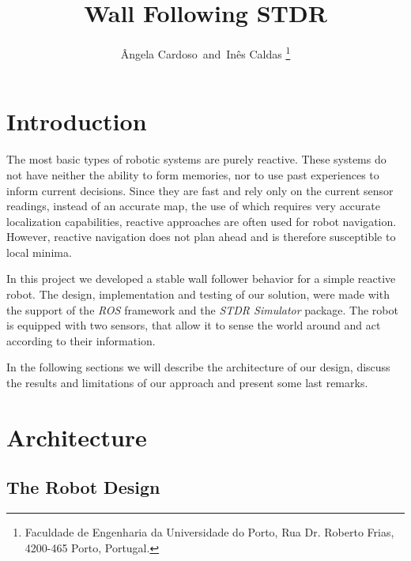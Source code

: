 \documentclass[10pt,journal,compsoc]{IEEEtran}
\begin{document}
\title{Wall Following STDR}
\author{\^{A}ngela Cardoso~and~In\^{e}s Caldas%
\thanks{Faculdade de Engenharia da Universidade do Porto, Rua Dr. Roberto Frias, 4200-465 Porto, Portugal.}}



\maketitle


\section{Introduction}
The most basic types of robotic systems are purely reactive. These systems do not have neither the ability to form memories, nor to use past experiences to inform current decisions. Since they are fast and rely only on the current sensor readings, instead of an accurate map, the use of which requires very accurate localization capabilities, reactive approaches are often used for robot navigation. However, reactive navigation does not plan ahead and is therefore susceptible to local minima. 

In this project we developed a stable wall follower behavior for a simple reactive robot. The design, implementation and testing of our solution, were made with the support of the \textit{ROS} framework and the \textit{STDR Simulator} package. The robot is equipped with two sensors, that allow it to sense the world around and act according to their information. 

In the following sections we will describe the architecture of our design, discuss the results and limitations of our approach and present some last remarks.

\cite{example}

\section{Architecture}
\subsection{The Robot Design}
\end{document}
